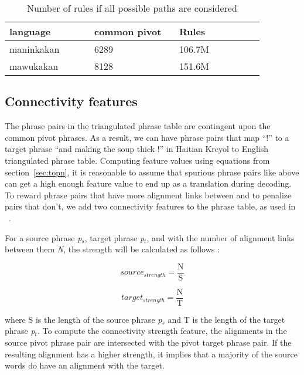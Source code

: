         \begin{table}
                \footnotesize
                \small
                \centering

                \begin{tabular}{p{0.3\linewidth}p{0.3\linewidth}p{0.3\linewidth}}
                \toprule
                language & common pivot & Rules \\
                \toprule
                maninkakan & 6289 & 106.7M \\
                mawukakan & 8128 & 151.6M \\
                \bottomrule
                \end{tabular}
                \caption{Number of rules if all possible paths are considered}
                \label{table:allrules}
        \end{table}


\subsection{Connectivity features}
\label{subsec:connectivity}
        The phrase pairs in the triangulated phrase table are contingent upon the common pivot phrases. As a result, we can have phrase pairs that map ``!'' to a target phrase ``and making the soup thick !'' in Haitian Kreyol to English triangulated phrase table. Computing feature values using equations from section~\ref{sec:topn}, it is reasonable to assume that spurious phrase pairs like above can get a high enough feature value to end up as a translation during decoding. To reward phrase pairs that have more alignment links between and to penalize pairs that don't, we add two connectivity features to the phrase table, as used in ~\cite{Ahmed:13}.

        For a source phrase \emph{p$_s$}, target phrase \emph{p$_t$}, and with the number of alignment links between them \emph{N}, the strength will be calculated as follows :

        \begin{equation*}
                source_{strength} = \frac{\mathrm{N}}{\mathrm{S}}
        \end{equation*}

        \begin{equation*}
                target_{strength} = \frac{\mathrm{N}}{\mathrm{T}}
        \end{equation*}

        where S is the length of the source phrase \emph{p$_s$} and T is the length of the target phrase \emph{p$_t$}. To compute the connectivity strength feature, the alignments in the source pivot phrase pair are intersected with the pivot target phrase pair. If the resulting alignment has a higher strength, it implies that a majority of the source words do have an alignment with the target.


